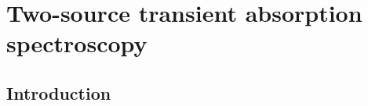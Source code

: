 \chapter{Two-source transient absorption spectroscopy}
\label{tatas}

\section{Introduction}
\label{intro_tatas}